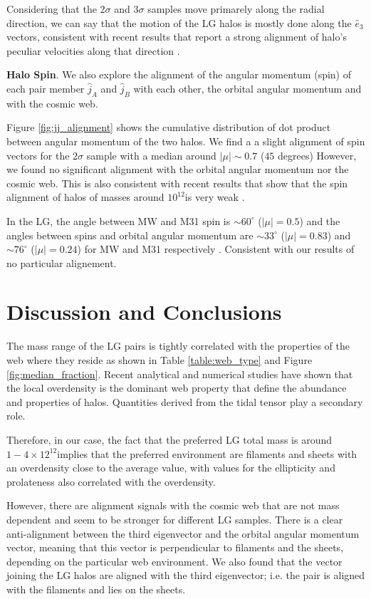 \documentclass{emulateapj}
\newcommand{\Msun}{{\ifmmode{{\rm {M_{\odot}}}}\else{${\rm{M_{\odot}}}$}\fi}}
\begin{document}
Considering that the 2$\sigma$ and 3$\sigma$ samples move primarely
along the radial direction, we can say that the motion of the LG
halos is mostly done along the $\hat{e}_3$ vectors, consistent with
recent results that report a strong alignment of halo's peculiar
velocities along that direction \citep{ForeroRomero2014}.

{\bf Halo Spin}. We also explore the alignment of the  angular
momentum (spin) of each pair member $\hat{j}_A$ and $\hat{j}_B$ with
each other, the orbital angular momentum and with the cosmic web. 

Figure \ref{fig:jj_alignment} shows the cumulative distribution of dot
product between angular momentum of the  two halos. We find a a slight
alignment of spin vectors for the $2\sigma$ sample with a median around
$|\mu|\sim 0.7$ ($45$ degrees) However, we found no significant
alignment with the orbital angular momentum nor the cosmic web. This
is also consistent with recent results that show that the spin
alignment of halos of masses around $10^{12}$\Msun is very weak
\citep{ForeroRomero2014}. 
 
In the LG, the angle between MW and M31 spin is $\sim60^{\circ}$
($|\mu|=0.5$) and the angles between spins and orbital angular
momentum are $\sim33^{\circ}$ ($|\mu|=0.83$) and $\sim76^{\circ}$
($|\mu|=0.24$) for MW and M31 respectively
\citep{2012ApJ...753....9V}. Consistent with our results of no particular
alignement.

\section{Discussion and Conclusions}
\label{sec:discussion}

The mass range of the LG pairs is tightly correlated with the
properties of the web where they reside as shown in Table
\ref{table:web_type} and Figure \ref{fig:median_fraction}. Recent
analytical \citep{Alonso2014} and numerical studies \citep{Metuki2014}
have shown that the local overdensity is the dominant web property
that define the abundance and properties of halos. Quantities derived
from the tidal tensor play a secondary role. 

Therefore, in our case, the fact that the preferred LG total mass is
around $1-4\times 12^{12}$\Msun implies that the preferred environment
are filaments and sheets with an overdensity close to the average
value, with values for the ellipticity and prolateness also correlated
with the overdensity.

However, there are alignment signals with the cosmic web that are not
mass dependent and seem to be stronger for different LG samples. There
is a clear anti-alignment between the third eigenvector and the
orbital angular momentum vector, meaning that this vector is
perpendicular to filaments and the sheets, depending on the
particular web environment. We also found that the vector joining the
LG halos are aligned with the third eigenvector; i.e. the pair is
aligned with the filaments and lies on the sheets.
\end{document}
